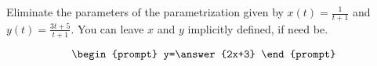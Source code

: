 \documentclass{ximera}
\author{Gregory Hartman \and Matthew Carr}
\begin{document}
\begin{exercise}




Eliminate the parameters of the parametrization given by $x(t)=\frac{1}{t+1}$ and $y(t)=\frac{3t+5}{t+1}$. You can leave $x$ and $y$ implicitly defined, if need be.

\[
\begin{prompt}
y=\answer{2x+3}
\end{prompt}
\]

\end{exercise}
\end{document}
